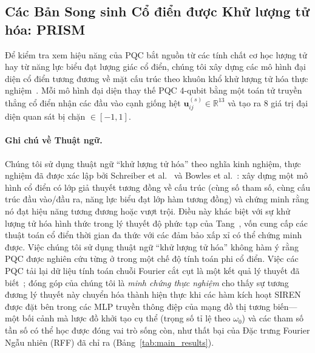 \documentclass[10pt,twocolumn,letterpaper]{article}
\begin{document}
\subsection{Các Bản Song sinh Cổ điển được Khử lượng tử hóa: PRISM}
\label{sec:periodic_egnn}

Để kiểm tra xem hiệu năng của PQC bắt nguồn từ các tính chất cơ học lượng tử hay từ năng lực biểu đạt lượng giác cổ điển, chúng tôi xây dựng các mô hình đại diện cổ điển tương đương về mặt cấu trúc theo khuôn khổ khử lượng tử hóa thực nghiệm~\cite{Tang:2018lmw, Schreiber:2022roq, pegg2026isoqgnn}.
Mỗi mô hình đại diện thay thế PQC 4-qubit bằng một toán tử truyền thẳng cổ điển nhận các đầu vào cạnh giống hệt $\mathbf{u}_{ij}^{(s)} \in \mathbb{R}^{13}$ và tạo ra 8 giá trị đại diện quan sát bị chặn $\in [-1, 1]$.

\paragraph{Ghi chú về Thuật ngữ.}
Chúng tôi sử dụng thuật ngữ ``khử lượng tử hóa'' theo nghĩa kinh nghiệm, thực nghiệm đã được xác lập bởi Schreiber et al.~\cite{Schreiber:2022roq} và Bowles et al.~\cite{bowles2024better}: xây dựng một mô hình cổ điển có lớp giả thuyết tương đồng về cấu trúc (cùng số tham số, cùng cấu trúc đầu vào/đầu ra, năng lực biểu đạt lớp hàm tương đồng) và chứng minh rằng nó đạt hiệu năng tương đương hoặc vượt trội.
Điều này khác biệt với sự khử lượng tử hóa hình thức trong lý thuyết độ phức tạp của Tang~\cite{Tang:2018lmw}, vốn cung cấp các thuật toán cổ điển thời gian đa thức với các đảm bảo xấp xỉ có thể chứng minh được.
Việc chúng tôi sử dụng thuật ngữ ``khử lượng tử hóa'' không hàm ý rằng PQC được nghiên cứu từng ở trong một chế độ tính toán phi cổ điển.
Việc các PQC tải lại dữ liệu tính toán chuỗi Fourier cắt cụt là một kết quả lý thuyết đã biết~\cite{Schuld:2020enb, landman2023approximating}; đóng góp của chúng tôi là \textit{minh chứng thực nghiệm} cho thấy sự tương đương lý thuyết này chuyển hóa thành hiện thực khi các hàm kích hoạt SIREN được đặt bên trong các MLP truyền thông điệp của mạng đồ thị tương biến---một bối cảnh mà lược đồ khởi tạo cụ thể (trọng số tỉ lệ theo $\omega_0$) và các tham số tần số có thể học được đóng vai trò sống còn, như thất bại của Đặc trưng Fourier Ngẫu nhiên (RFF) đã chỉ ra (Bảng~\ref{tab:main_results}).
\end{document}
